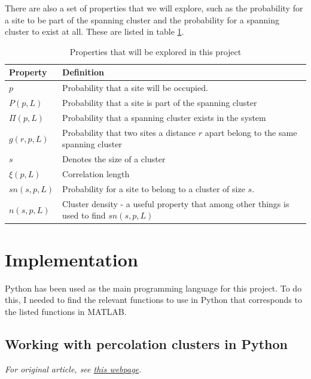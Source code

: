 \documentclass[a4paper,reprint,floatfix,amsmath,amssymb,aps,pra]{revtex4-1}
\begin{document}
There are also a set of properties that we will explore, such as the probability for a site to be part of the spanning cluster and the probability for a spanning cluster to exist at all. These are listed in table \ref{tab:properties}.
\begingroup
\begin{table}[h]
\begin{ruledtabular}
\begin{tabular}{l p{}}
Property       &                  Definition \\
\hline
$p$             &       Probability that a site will be occupied. \\
$P(p, L)$       &       Probability that a site is part of the spanning cluster \\
$\Pi(p,L)$      &       Probability that a spanning cluster exists in the system \\
$g(r,p,L)$      &       Probability that two sites a distance $r$ apart belong to the same spanning cluster \\
$s$             &       Denotes the size of a cluster \\
$\xi(p,L)$      &       Correlation length \\
$sn(s,p,L)$     &       Probability for a site to belong to a cluster of size $s$. \\
$n(s,p,L)$      &       Cluster density - a useful property that among other things is used to find $sn(s,p,L)$ \\
\end{tabular}
\end{ruledtabular}
\caption{Properties that will be explored in this project}
\label{tab:properties}
\end{table}
\endgroup

\section{Implementation}

Python has been used as the main programming language for this project. To do this, I needed to find the relevant functions to use in Python that corresponds to the listed functions in MATLAB.

\subsection{Working with percolation clusters in Python}

\emph{For original article, see \href{http://dragly.org/2013/03/25/working-with-percolation-clusters-in-python/}{this webpage}.}
\end{document}
